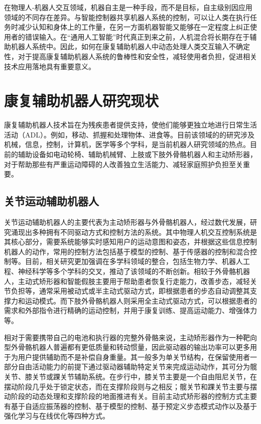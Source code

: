 在物理人-机器人交互领域，机器自主是一种手段，而不是目标，自主级别因应用领域的不同存在差异。与智能控制器共享机器人系统的控制，可以让人类在执行任务时减少认知和身体上的工作量，在另一方面机器智能又能够在一定程度上纠正使用者的错误输入。在``通用人工智能''时代真正到来之前，人机混合将长期存在于辅助机器人系统中\cite{ZhangMianXiangRenJiXuGuanJueCeDeHunHeZhiNengFangFaYanJiu2021}。因此，如何在康复辅助机器人中动态处理人类交互输入不确定性，对于提高康复辅助机器人系统的鲁棒性和安全性，减轻使用者负担，促进相关技术应用落地具有重要意义。

\section{康复辅助机器人研究现状}
康复辅助机器人技术旨在为残疾患者提供支持，使他们能够更独立地进行日常生活活动（ADL）。例如，移动、抓握和处理物体、进食等。目前该领域的的研究涉及机械，信息，控制，计算机，医学等多个学科，是当前机器人研究领域的热点。目前的辅助设备如电动轮椅、辅助机械臂、上肢或下肢外骨骼机器人和主动矫形器，对于帮助那些有严重运动障碍的人改善独立生活能力、减轻家庭照护负担至关重要。
\subsection{关节运动辅助机器人}
关节运动辅助机器人的主要代表为主动矫形器与外骨骼机器人，经过数代发展，研究涌现出多种拥有不同驱动方式和控制方法的系统。其中物理人机交互控制系统是其核心部分，需要系统能够实时感知用户的运动意图和姿态，并根据这些信息控制机器人的动作，常用的控制方法包括基于模型的控制、基于传感器的控制和混合控制等。目前，相关研究更加强调在多学科领域的整合，包括生物力学、机器人工程、神经科学等多个学科的交叉，推动了该领域的不断创新。相较于外骨骼机器人，主动式矫形器和智能假肢主要用于帮助患者恢复行走能力，改善步态，减轻关节负担等，通常采用被动式或半主动式驱动方式，即根据患者的步态自动调整其支撑力和运动模式。而下肢外骨骼机器人则采用全主动式驱动方式，可以根据患者的需求和外部指令进行精确的运动控制，并用于康复训练、提高运动能力、增强体力等。

相对于需要携带自己的电池和执行器的完整外骨骼来说，主动矫形器作为一种靶向型外骨骼机器人普遍都有更低质量和转动惯量，因此驱动器的输出功率可以更多用于为用户提供辅助而不是补偿自身重量\cite{collinsReducingEnergyCost2015,zhangHumanintheloopOptimizationExoskeleton2017a}。其一般多为单关节结构，在保留使用者一部分自由活动能力的前提下通过驱动器辅助特定关节来完成运动动作，其可分为髋关节、膝关节或踝关节辅助系统\cite{malcolmExperimentalStudyRole2009}。在步行中，膝关节主要是一个自由阻尼关节，在摆动阶段几乎处于锁定状态，而在支撑阶段则与之相反；髋关节和踝关节主要与摆动阶段的动态处理和支撑阶段的地面推进有关。目前主动式矫形器的控制方式主要有基于自适应振荡器的控制、基于模型的控制、基于预定义步态模式动作以及基于强化学习与在线优化等四种方式\cite{yanReviewAssistiveStrategies2015}。

